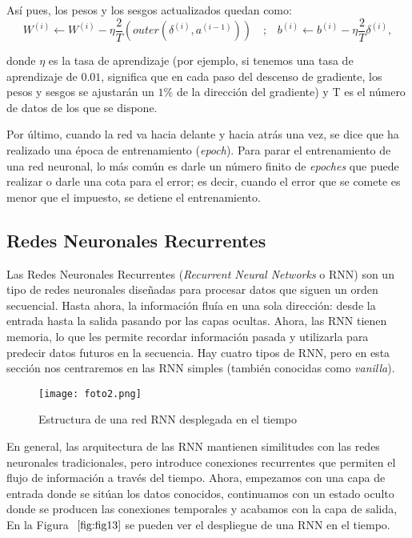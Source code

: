 \documentclass[12pt,twoside]{article}
\begin{document}
Así pues, los pesos y los sesgos actualizados quedan como:
\begin{equation}
W^{(i)} \leftarrow W^{(i)} - \eta \frac{2}{T}\left(outer(\delta^{(i)}, a^{(i-1)})\right)
\quad \text{;} \quad
b^{(i)} \leftarrow b^{(i)} - \eta\frac{2}{T} \delta^{(i)}, 
\end{equation}

donde $\eta$ es la tasa de aprendizaje (por ejemplo, si tenemos una tasa de aprendizaje de $0.01$, significa que en cada paso del descenso de gradiente, los pesos y sesgos se ajustarán un $1 \%$ de la dirección del gradiente) y T es el número de datos de los que se dispone.

Por último, cuando la red va hacia delante y hacia atrás una vez, se dice que ha realizado una época de entrenamiento (\textit{epoch}). Para parar el entrenamiento de una red neuronal, lo más común es darle un número finito de \textit{epoches} que puede realizar o darle una cota para el error; es decir, cuando el error que se comete es menor que el impuesto, se detiene el entrenamiento.



\subsection{Redes Neuronales Recurrentes}\label{sec:14}

 Las Redes Neuronales Recurrentes (\textit{Recurrent Neural Networks} o RNN) \cite{rnn1} son un tipo de redes neuronales diseñadas para procesar datos que siguen un orden secuencial. Hasta ahora, la información fluía en una sola dirección: desde la entrada hasta la salida pasando por las capas ocultas. Ahora, las RNN tienen memoria, lo que les permite recordar información pasada y utilizarla para predecir datos futuros en la secuencia. Hay cuatro tipos de RNN, pero en esta sección nos centraremos en las RNN simples (también conocidas como \textit{vanilla}).


\begin{figure}[h]
    \centering
    \texttt{[image: foto2.png]}
    \caption{Estructura de una red RNN desplegada en el tiempo} 
    \label{fig:fig13}
\end{figure}

En general, las arquitectura de las RNN mantienen similitudes con las redes neuronales tradicionales, pero introduce conexiones recurrentes que permiten el flujo de información a través del tiempo. Ahora, empezamos con una capa de entrada donde se sitúan los datos conocidos, continuamos con un estado oculto donde se producen las conexiones temporales y acabamos con la capa de salida, En la Figura $~\ref{fig:fig13}$ se pueden ver el despliegue de una RNN en el tiempo. 
\end{document}
